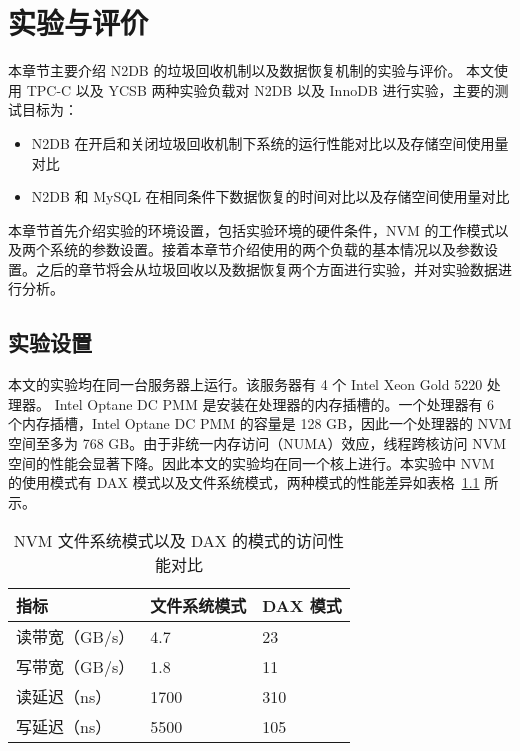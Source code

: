 
\chapter{实验与评价}

本章节主要介绍 N2DB 的垃圾回收机制以及数据恢复机制的实验与评价。
本文使用 TPC-C 以及 YCSB 两种实验负载对 N2DB 以及 InnoDB 进行实验，主要的测试目标为：
\begin{itemize}
    \item N2DB 在开启和关闭垃圾回收机制下系统的运行性能对比以及存储空间使用量对比
    \item N2DB 和 MySQL 在相同条件下数据恢复的时间对比以及存储空间使用量对比
\end{itemize}

本章节首先介绍实验的环境设置，包括实验环境的硬件条件，NVM 的工作模式以及两个系统的参数设置。接着本章节介绍使用的两个负载的基本情况以及参数设置。之后的章节将会从垃圾回收以及数据恢复两个方面进行实验，并对实验数据进行分析。

\section{实验设置}

本文的实验均在同一台服务器上运行。该服务器有 4 个 Intel Xeon Gold 5220 处理器。
Intel Optane DC PMM 是安装在处理器的内存插槽的。一个处理器有 6 个内存插槽，Intel Optane DC PMM 的容量是 128 GB，因此一个处理器的 NVM 空间至多为 768 GB。由于非统一内存访问（NUMA）效应，线程跨核访问 NVM 空间的性能会显著下降。因此本文的实验均在同一个核上进行。本实验中 NVM 的使用模式有 DAX 模式以及文件系统模式，两种模式的性能差异如表格~\ref{tab:nvm-metric} 所示。

\begin{table}
    \centering
    \caption{NVM 文件系统模式以及 DAX 的模式的访问性能对比}
    \begin{tabular}{lll}
        \toprule
        指标           & 文件系统模式 & DAX 模式 \\
        \midrule
        读带宽（GB/s） & 4.7          & 23       \\
        写带宽（GB/s） & 1.8          & 11       \\
        读延迟（ns）   & 1700         & 310      \\
        写延迟（ns）   & 5500         & 105      \\
        \bottomrule
    \end{tabular}
    \label{tab:nvm-metric}
\end{table}


